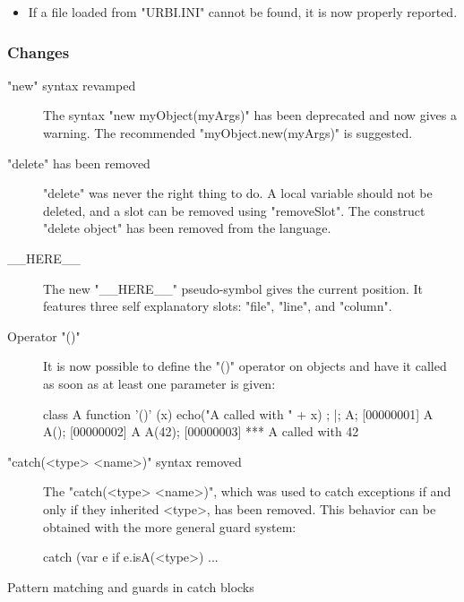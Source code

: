 \begin{itemize}
\item If a file loaded from "URBI.INI" cannot be found, it is now
  properly reported.
\end{itemize}


\subsubsection{Changes}

\begin{description}
\item["new" syntax revamped]
The syntax "new myObject(myArgs)" has been deprecated and now gives a
warning. The recommended "myObject.new(myArgs)" is suggested.

\item["delete" has been removed]

"delete" was never the right thing to do. A local variable should
not be deleted, and a slot can be removed using "removeSlot".
The construct "delete object" has been removed from the
language.

\item[\_\_HERE\_\_]

The new "\_\_HERE\_\_" pseudo-symbol gives the current position.  It
features three self explanatory slots: "file", "line", and "column".

\item[Operator "()"]

It is now possible to define the "()" operator on objects and have
it called as soon as at least one parameter is given:

\begin{urbiscript}
class A {
  function '()' (x) { echo("A called with " + x) };
}|;
A;
[00000001] A
A();
[00000002] A
A(42);
[00000003] *** A called with 42
\end{urbiscript}

\item["catch(<type> <name>)" syntax removed]

The "catch(<type> <name>)", which was used to catch exceptions if and
only if they inherited <type>, has been removed. This behavior can be
obtained with the more general guard system:

\begin{urbiunchecked}
catch (var e if e.isA(<type>)
{
  ...
}
\end{urbiunchecked}

\item[Pattern matching and guards in catch blocks]


\end{description}
